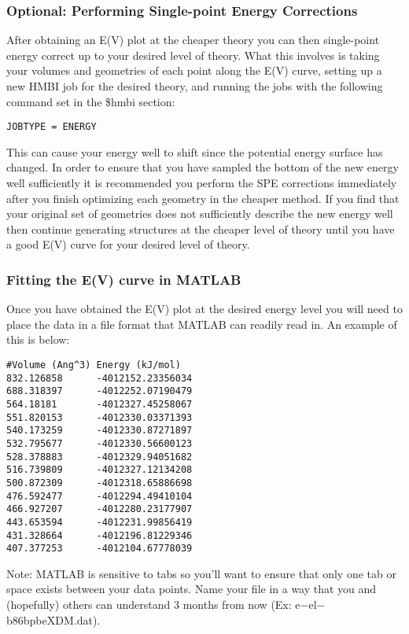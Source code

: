 \documentclass[11pt,letterpaper]{article}
\begin{document}
\begin{spacing}{1.0}
\subsubsection{Optional: Performing Single-point Energy Corrections}
After obtaining an E(V) plot at the cheaper theory you can then single-point energy correct up to your desired level of theory. What this involves is taking your volumes and geometries of each point along the E(V) curve, setting up a new HMBI job for the desired theory, and running the jobs with the following command set in the \$hmbi section:

\begin{verbatim}
JOBTYPE = ENERGY
\end{verbatim}

This can cause your energy well to shift since the potential energy surface has changed. In order to ensure that you have sampled the bottom of the new energy well sufficiently  it is recommended you perform the SPE corrections immediately after you finish optimizing each geometry in the cheaper method. If you find that your original set of geometries does not sufficiently describe the new energy well then continue generating structures at the cheaper level of theory until you have a good E(V) curve for your desired level of theory.

\subsubsection{Fitting the E(V) curve in MATLAB}

Once you have obtained the E(V) plot at the desired energy level you will need to place the data in a file format that MATLAB can readily read in. An example of this is below:

\begin{verbatim}
#Volume (Ang^3) Energy (kJ/mol)
832.126858      -4012152.23356034
688.318397      -4012252.07190479
564.18181       -4012327.45258067
551.820153      -4012330.03371393
540.173259      -4012330.87271897
532.795677      -4012330.56600123
528.378883      -4012329.94051682
516.739809      -4012327.12134208
500.872309      -4012318.65886698
476.592477      -4012294.49410104
466.927207      -4012280.23177907
443.653594      -4012231.99856419
431.328664      -4012196.81229346
407.377253      -4012104.67778039
\end{verbatim}

Note: MATLAB is sensitive to tabs so you'll want to ensure that only one tab or space exists between your data points. Name your file in a way that you and (hopefully) others can understand 3 months from now (Ex: e$-$el$-$b86bpbeXDM.dat).


\end{spacing}
\end{document}
